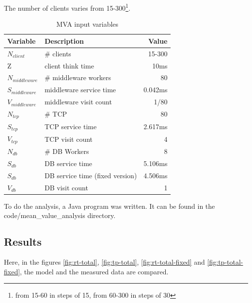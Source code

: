 \documentclass[a4paper]{article}
\begin{document}
{\noindent The number of clients varies from 15-300\footnote{from 15-60 in steps of 15, from 60-300 in steps of 30}.\\

\begin{table}[h!]
\begin{center}
\begin{tabular}{|l|l|r|}
\hline
\textbf{Variable} & \textbf{Description} & \textbf{Value} \\ \hline
$N_{client}$ & \# clients & 15-300 \\ \hline
Z & client think time & 10ms \\ \hline
$N_{middleware}$ & \# middleware workers & 80 \\ \hline
$S_{middleware}$ & middleware service time & 0.042ms \\ \hline
$V_{middleware}$ & middleware visit count & 1/80 \\ \hline
$N_{tcp}$ & \# TCP & 80 \\ \hline
$S_{tcp}$ & TCP service time & 2.617ms \\ \hline
$V_{tcp}$ & TCP visit count & 4 \\ \hline
$N_{db}$ & \# DB Workers & 8 \\ \hline
$S_{db}$ & DB service time & 5.106ms \\ \hline
$S_{db}$ & DB service time (fixed version) & 4.506ms \\ \hline
$V_{db}$ & DB visit count & 1 \\ \hline
\end{tabular}
\caption{MVA input variables}
\end{center}
\end{table}

To do the analysis, a Java program was written. It can be found in the code/mean\_value\_analysis directory.\\

\subsection{Results}

Here, in the figures \ref{fig:rt-total}, \ref{fig:tp-total}, \ref{fig:rt-total-fixed} and \ref{fig:tp-total-fixed}, the model and the measured data are compared.

}
\end{document}
